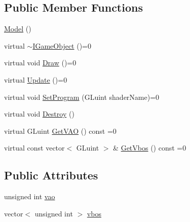 \subsection*{Public Member Functions}
\begin{DoxyCompactItemize}
\item 
\hyperlink{structijengine_1_1Model_a78b86cd4f07879f775615b26a6616df7}{Model} ()
\item 
virtual \hyperlink{structijengine_1_1Model_a47b164e36700e7353da3e4a85ff636c3}{$\sim$\-I\-Game\-Object} ()=0
\item 
virtual void \hyperlink{structijengine_1_1Model_aff9561a2feecc7a232bc1e7ac97475ad}{Draw} ()=0
\item 
virtual \hyperlink{structijengine_1_1Model_a035780f6602643ddb3674ddc9b400aed}{Update} ()=0
\item 
virtual void \hyperlink{structijengine_1_1Model_a85245d758ddabf9dcfcf5f542999ad87}{Set\-Program} (G\-Luint shader\-Name)=0
\item 
virtual void \hyperlink{structijengine_1_1Model_adb632186be89b40c5e9cc5f355fc05e6}{Destroy} ()
\item 
virtual G\-Luint \hyperlink{structijengine_1_1Model_ae95b4198766618c787ee963bb1c75b81}{Get\-V\-A\-O} () const =0
\item 
virtual const vector$<$ G\-Luint $>$ \& \hyperlink{structijengine_1_1Model_a5b560d6f47bd2b0999886751f1fd743e}{Get\-Vbos} () const =0
\end{DoxyCompactItemize}
\subsection*{Public Attributes}
\begin{DoxyCompactItemize}
\item 
unsigned int \hyperlink{structijengine_1_1Model_ac8e3b6e589118cfcc8141855262218bf}{vao}
\item 
vector$<$ unsigned int $>$ \hyperlink{structijengine_1_1Model_a8228166fb6499a5b340981b15b27c098}{vbos}
\end{DoxyCompactItemize}


